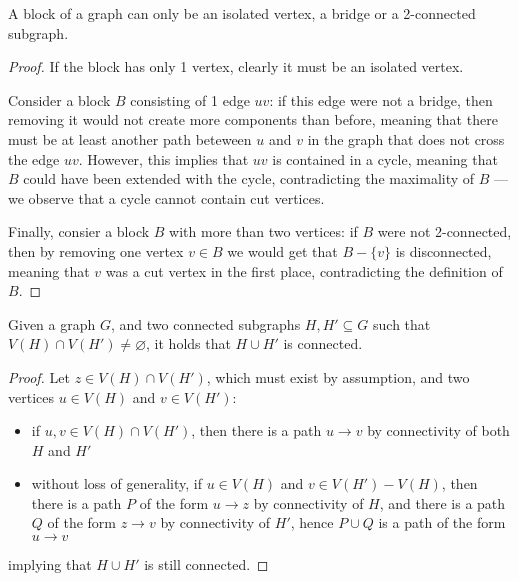 \documentclass[a4paper, 12pt]{report}
\begin{document}
    \begin{framedprop}[label={blocks 2conn}]{}
        A block of a graph can only be an isolated vertex, a bridge or a 2-connected subgraph.
    \end{framedprop}

    \begin{proof}
        If the block has only 1 vertex, clearly it must be an isolated vertex.

        Consider a block $B$ consisting of 1 edge $uv$: if this edge were not a bridge, then removing it would not create more components than before, meaning that there must be at least another path beteween $u$ and $v$ in the graph that does not cross the edge $uv$. However, this implies that $uv$ is contained in a cycle, meaning that $B$ could have been extended with the cycle, contradicting the maximality of $B$ --- we observe that a cycle cannot contain cut vertices.

        Finally, consier a block $B$ with more than two vertices: if $B$ were not 2-connected, then by removing one vertex $v \in B$ we would get that $B - \{v\}$ is disconnected, meaning that $v$ was a cut vertex in the first place, contradicting the definition of $B$.
    \end{proof}

    \begin{framedlem}{}
        Given a graph $G$, and two connected subgraphs $H, H' \subseteq G$ such that $V(H) \cap V(H') \neq \varnothing$, it holds that $H \cup H'$ is connected.
    \end{framedlem}

    \begin{proof}
        Let $z \in V(H) \cap V(H')$, which must exist by assumption, and two vertices $u \in V(H)$ and $v \in V(H')$:

        \begin{itemize}
            \item if $u, v \in V(H) \cap V(H')$, then there is a path $u \to v$ by connectivity of both $H$ and $H'$
            \item without loss of generality, if $u \in V(H)$ and $v \in V(H') - V(H)$, then there is a path $P$ of the form $u \to z$ by connectivity of $H$, and there is a path $Q$ of the form $z \to v$ by connectivity of $H'$, hence $P \cup Q$ is a path of the form $u \to v$
        \end{itemize}

        implying that $H \cup H'$ is still connected.
    \end{proof}
\end{document}
